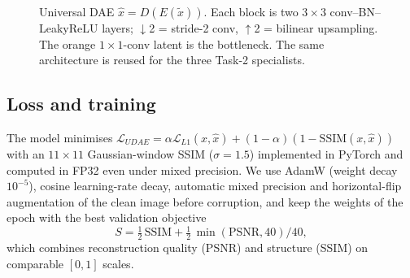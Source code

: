 \documentclass[conference]{IEEEtran}
\begin{document}
\begin{figure}[t]
\centering
{}
\caption{Universal DAE $\hat{x}=D(E(\tilde{x}))$. Each block is two $3\times3$ conv--BN--LeakyReLU layers; $\downarrow$2 = stride-2 conv, $\uparrow$2 = bilinear upsampling. The orange $1\times1$-conv latent is the bottleneck. The same architecture is reused for the three Task-2 specialists.}
\label{fig:ae}
\end{figure}

\subsection{Loss and training}
The model minimises $\mathcal{L}_{UDAE}=\alpha\mathcal{L}_{L1}(x,\hat{x})+(1-\alpha)(1-\text{SSIM}(x,\hat{x}))$ with an $11\times11$ Gaussian-window SSIM ($\sigma=1.5$) implemented in PyTorch and computed in FP32 even under mixed precision. We use AdamW (weight decay $10^{-5}$), cosine learning-rate decay, automatic mixed precision and horizontal-flip augmentation of the clean image before corruption, and keep the weights of the epoch with the best validation objective
\begin{equation}
S=\tfrac12\,\text{SSIM}+\tfrac12\,\min(\text{PSNR},40)/40,
\end{equation}
which combines reconstruction quality (PSNR) and structure (SSIM) on comparable $[0,1]$ scales.
\end{document}

